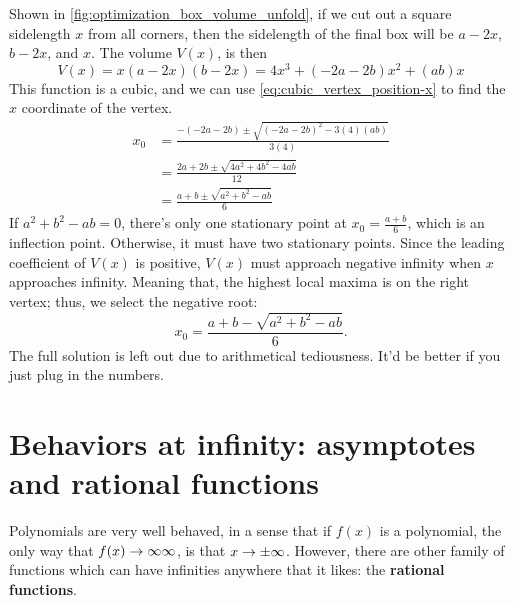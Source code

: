 Shown in \cref{fig:optimization_box_volume_unfold}, if we cut out a square sidelength $x$ from all corners, then the sidelength of the final box will be $a - 2x$, $b - 2x$, and $x$. The volume $V(x)$, is then
\begin{equation}
	V(x) = x(a - 2x)(b - 2x) = 4x^3 + (- 2a - 2b)x^2 + (ab)x
\end{equation}
This function is a cubic, and we can use \cref{eq:cubic_vertex_position-x} to find the $x$ coordinate of the vertex.
\begin{align}
	x_0 &= \frac{- (- 2a - 2b) \pm \sqrt{(- 2a - 2b)^2 - 3(4)(ab)}}{3(4)} \\
		&= \frac{2a + 2b \pm \sqrt{4a^2 + 4b^2 - 4ab}}{12} \\
		&= \frac{a + b \pm \sqrt{a^2 + b^2 - ab}}{6}
\end{align}
If $a^2 + b^2 - ab = 0$, there's only one stationary point at $x_0 = \frac{a + b}{6}$, which is an inflection point. Otherwise, it must have two stationary points. Since the leading coefficient of $V(x)$ is positive, $V(x)$ must approach negative infinity when $x$ approaches infinity. Meaning that, the highest local maxima is on the right vertex; thus, we select the negative root:
\begin{equation}
	x_0 = \frac{a + b - \sqrt{a^2 + b^2 - ab}}{6}.
\end{equation}
The full solution is left out due to arithmetical tediousness. It'd be better if you just plug in the numbers.

\section{Behaviors at infinity: asymptotes and rational functions}

Polynomials are very well behaved, in a sense that if $f(x)$ is a polynomial, the only way that $f(x) \rightarrow \infty\infty$, is that $x \rightarrow \pm\infty$. However, there are other family of functions which can have infinities anywhere that it likes: the \textbf{rational functions}.

